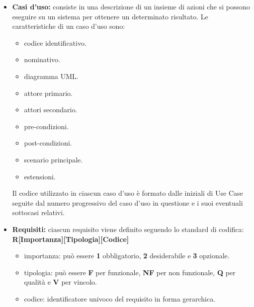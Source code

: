     \begin{itemize}
        \item \textbf{Casi d'uso:} consiste in una descrizione di un insieme di azioni che si possono eseguire su un sistema per ottenere un determinato risultato.
        Le caratteristiche di un caso d'uso sono:
        \begin{itemize}
            \item {codice identificativo.}
            \item {nominativo.}
            \item {diagramma UML.}
            \item {attore primario.}
            \item {attori secondario.}
            \item {pre-condizioni.}
            \item {post-condizioni.}
            \item {scenario principale.}
            \item {estensioni.}
        \end{itemize}
        Il codice utilizzato in ciascun caso d'uso è formato dalle iniziali di Use Case seguite dal numero progressivo del caso d'uso in questione e i suoi eventuali sottocasi relativi.
        \item \textbf{Requisiti:} ciascun requisito viene definito seguendo lo standard di codifica:\\
        \textbf{R[Importanza][Tipologia][Codice]}
        \begin {itemize}
            \item{importanza:} può essere \textbf{1} obbligatorio, \textbf{2} desiderabile e \textbf{3} opzionale.
            \item {tipologia:} può essere \textbf{F} per funzionale, \textbf{NF} per non funzionale, \textbf{Q} per qualità e \textbf{V} per vincolo.
            \item {codice:} identificatore univoco del requisito in forma gerarchica.
        \end {itemize}
    \end{itemize}
